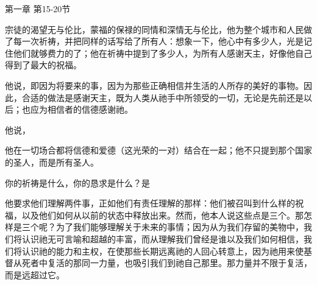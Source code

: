 第一章 第15-20节 \par

\par

宗徒的渴望无与伦比，蒙福的保禄的同情和深情无与伦比，他为整个城市和人民做了每一次祈祷，并把同样的话写给了所有人：想象一下，他心中有多少人，光是记住他们就够费力的了；他在祈祷中提到了多少人，为所有人感谢天主，好像他自己得到了最大的祝福。\par

他说，即因为将要来的事，因为为那些正确相信并生活的人所存的美好的事物。因此，合适的做法是感谢天主，既为人类从祂手中所领受的一切，无论是先前还是以后；也应为相信者的信德感谢祂。\par

他说，\par

他在一切场合都将信德和爱德（这光荣的一对）结合在一起；他不只提到那个国家的圣人，而是所有圣人。\par

\par

你的祈祷是什么，你的恳求是什么？是\par

他要求他们理解两件事，正如他们有责任理解的那样：他们被召叫到什么样的祝福，以及他们如何从以前的状态中释放出来。然而，他本人说这些点是三个。那怎样是三个呢？为了我们能够理解关于未来的事情；因为从为我们存留的美物中，我们将认识祂无可言喻和超越的丰富，而从理解我们曾经是谁以及我们如何相信，我们将认识祂的能力和主权，在使那些长期远离祂的人回心转意上，因为祂用来使基督从死者中复活的那同一力量，也吸引我们到祂自己那里。那力量并不限于复活，而是远超过它。\par

\par

